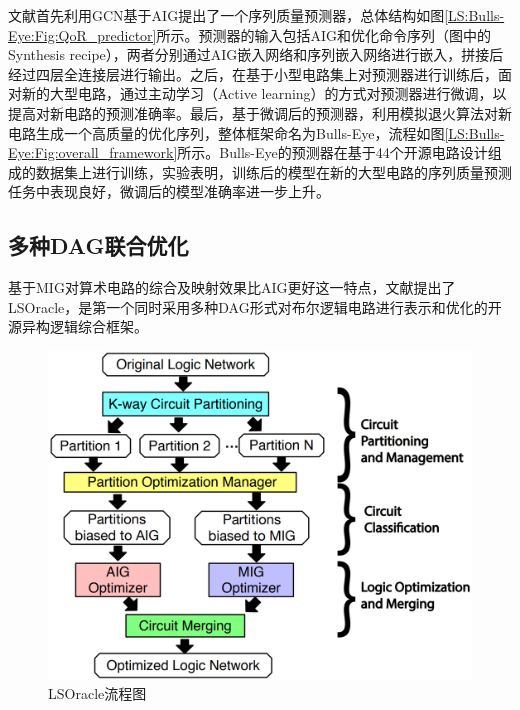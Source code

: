 文献\cite{LS:Bulls-Eye}首先利用GCN基于AIG提出了一个序列质量预测器，总体结构如图\ref{LS:Bulls-Eye:Fig:QoR_predictor}所示。预测器的输入包括AIG和优化命令序列（图中的Synthesis recipe），两者分别通过AIG嵌入网络和序列嵌入网络进行嵌入，拼接后经过四层全连接层进行输出。之后，在基于小型电路集上对预测器进行训练后，面对新的大型电路，通过主动学习（Active learning）的方式对预测器进行微调，以提高对新电路的预测准确率。最后，基于微调后的预测器，利用模拟退火算法对新电路生成一个高质量的优化序列，整体框架命名为Bulls-Eye，流程如图\ref{LS:Bulls-Eye:Fig:overall_framework}所示。Bulls-Eye的预测器在基于44个开源电路设计组成的数据集上进行训练，实验表明，训练后的模型在新的大型电路的序列质量预测任务中表现良好，微调后的模型准确率进一步上升。

\subsection{多种DAG联合优化}

基于MIG对算术电路的综合及映射效果比AIG更好这一特点，文献\cite{LS:LSOracle}提出了LSOracle，是第一个同时采用多种DAG形式对布尔逻辑电路进行表示和优化的开源异构逻辑综合框架。

\begin{figure}[!htbp]
    \centering
    \includegraphics[width=0.7\linewidth]{./figs/LS-LSOracle-flow.png}
    \caption{LSOracle流程图}
    \label{LS:LSOracle:Fig:flow}
\end{figure}

